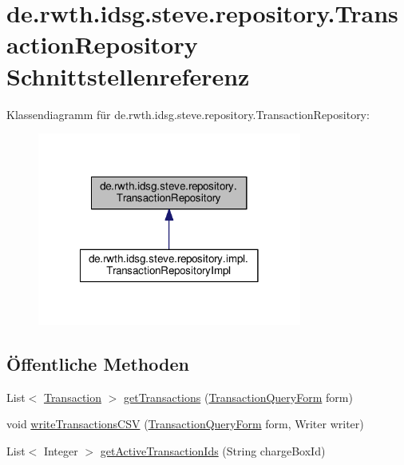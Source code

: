 \hypertarget{interfacede_1_1rwth_1_1idsg_1_1steve_1_1repository_1_1_transaction_repository}{\section{de.\-rwth.\-idsg.\-steve.\-repository.\-Transaction\-Repository Schnittstellenreferenz}
\label{interfacede_1_1rwth_1_1idsg_1_1steve_1_1repository_1_1_transaction_repository}
}


Klassendiagramm für de.\-rwth.\-idsg.\-steve.\-repository.\-Transaction\-Repository\-:\nopagebreak
\begin{figure}[H]
\begin{center}
\leavevmode
\includegraphics[width=246pt]{interfacede_1_1rwth_1_1idsg_1_1steve_1_1repository_1_1_transaction_repository__inherit__graph}
\end{center}
\end{figure}
\subsection*{Öffentliche Methoden}
\begin{DoxyCompactItemize}
\item 
List$<$ \hyperlink{classde_1_1rwth_1_1idsg_1_1steve_1_1repository_1_1dto_1_1_transaction}{Transaction} $>$ \hyperlink{interfacede_1_1rwth_1_1idsg_1_1steve_1_1repository_1_1_transaction_repository_af2ae1a05e2d5fb1de8fe20e8802da77d}{get\-Transactions} (\hyperlink{classde_1_1rwth_1_1idsg_1_1steve_1_1web_1_1dto_1_1_transaction_query_form}{Transaction\-Query\-Form} form)
\item 
void \hyperlink{interfacede_1_1rwth_1_1idsg_1_1steve_1_1repository_1_1_transaction_repository_a30ac3d2ce97caf4e5ee023de6ec9884f}{write\-Transactions\-C\-S\-V} (\hyperlink{classde_1_1rwth_1_1idsg_1_1steve_1_1web_1_1dto_1_1_transaction_query_form}{Transaction\-Query\-Form} form, Writer writer)
\item 
List$<$ Integer $>$ \hyperlink{interfacede_1_1rwth_1_1idsg_1_1steve_1_1repository_1_1_transaction_repository_af2452533bc153cc48dd5a8205ed45fd1}{get\-Active\-Transaction\-Ids} (String charge\-Box\-Id)
\end{DoxyCompactItemize}


